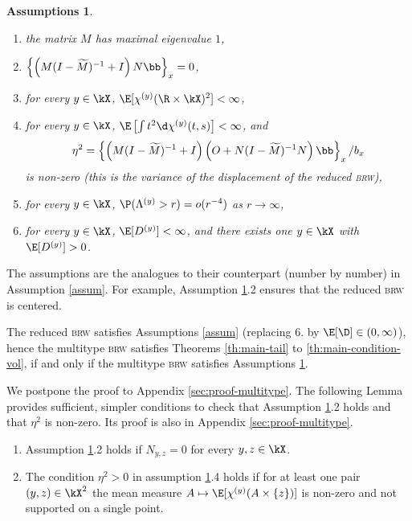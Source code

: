 \documentclass[10pt,a4paper]{article}
\DeclareMathOperator{\Var}{Var}
\newcommand{\brw}{\textsc{brw}\xspace}
\newtheorem{assumptions}{Assumptions}
\newcommand{\wM}{\widetilde{M}}
\renewcommand{\kx}{s}
\begin{document}
\begin{assumptions}\label{assum-multitype}
\begin{enumerate}
\item the matrix $M$ has maximal eigenvalue $1$,
\item $\left\{\left(M(I-\wM)^{-1} + I\right) N \bb\right\}_x = 0$, 
\item for every $y\in\kX$, $\E[\chi^{(y)}(\R\times\kX)^2] < \infty$, %
\item for every $y\in\kX$, $\E\left[\int t^2 \d\chi^{(y)}(t,\kx) \right] < \infty$, and
\[ \eta^2 = \left\{ \left(M (I-\wM)^{-1} + I\right) \left( O + N(I-\wM)^{-1} N \right) \bb \right\}_x / b_x \]
is non-zero (this is the variance of the displacement of the reduced \brw), 
\item for every $y\in\kX$, $\P(\Lambda^{(y)}>r) = o(r^{-4})$ as $r\to\infty$, 
\item for every $y\in\kX$, $\E[D^{(y)}]<\infty$, and there exists one $y\in\kX$ with $\E[D^{(y)}]>0$. 
\end{enumerate}
\end{assumptions}

The assumptions are the analogues to their counterpart (number by number) in Assumption \ref{assum}. For example, Assumption \ref{assum-multitype}.2 ensures that the reduced \brw is centered. 


\begin{proposition}\label{prop:equiv-assum}
The reduced \brw satisfies Assumptions \ref{assum} (replacing 6. by $\E[\D]\in (0,\infty)$), hence the multitype \brw satisfies Theorems \ref{th:main-tail} to \ref{th:main-condition-vol}, if and only if the multitype \brw satisfies Assumptions \ref{assum-multitype}. 
\end{proposition}

We postpone the proof to Appendix \ref{sec:proof-multitype}. The following Lemma provides sufficient, simpler conditions to check that Assumption \ref{assum-multitype}.2 holds and that $\eta^2$ is non-zero. Its proof is also in Appendix \ref{sec:proof-multitype}. 


\begin{lemma}\label{lem:simpler-assum}
\begin{enumerate}
\item Assumption \ref{assum-multitype}.2 holds if $N_{y,z} = 0$ for every $y,z\in\kX$.

\item The condition $\eta^2>0$ in assumption \ref{assum-multitype}.4 holds if for at least one pair $(y,z)\in\kX^2$ the mean measure $A \mapsto \E[\chi^{(y)}(A\times\{z\})]$ is non-zero and not supported on a single point.  
\end{enumerate}
\end{lemma}
\end{document}
